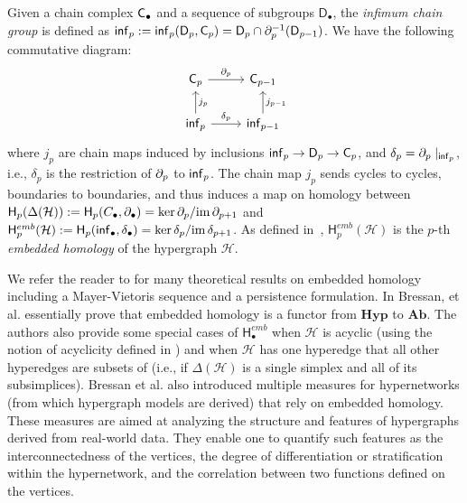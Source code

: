 \documentclass{amsart}
\newcommand{\Ab}{\mathrm{\textbf{Ab}}}
\newcommand{\Hyp}{\mathrm{\textbf{Hyp}}}
\newcommand{\Cgroup}        {\mm{\sf C}}
\newcommand{\Dgroup}	    {\mathsf{D}}
\newcommand{\Hgroup}	     {\mathsf{H}}
\renewcommand{\hom}[2]{\Hgroup_{#2}^{#1}}
\renewcommand{\H}{\mathcal{H}}
\newcommand{\myker}{\mm{\mathrm{ker\,}}}
\newcommand{\myim}{\mm{\mathrm{im\,}}}
\newcommand{\bdr}{\mm{\mathrm{\partial}}}
\newcommand {\mm}[1]        {\ifmmode{#1}\else{\mbox{\(#1\)}}\fi}
\newcommand{\infgroup}{\mm{\mathsf{inf}}}
\begin{document}
Given a chain complex $\Cgroup_\bullet$ and a sequence of subgroups $\Dgroup_\bullet$, the \emph{infimum chain group} is defined as $\infgroup_p := \infgroup_p(\Dgroup_p, \Cgroup_p) = \Dgroup_p \cap \bdr^{-1}_{p}(\Dgroup_{p-1})$. 
We have the following commutative diagram:
\[ \begin{tikzcd}
   \Cgroup_p \arrow{r}{\bdr_p} & \Cgroup_{p-1} \\%
   \infgroup_p \arrow{r}{\delta_p} \arrow[swap]{u}{j_p} & \infgroup_{p-1} \arrow[swap]{u}{j_{p-1}} 
   \end{tikzcd}
\]
where $j_p$ are chain maps induced by inclusions $\infgroup_p \to \Dgroup_p \to \Cgroup_p$, and
$\delta_p = \bdr_p \mid_{\infgroup_p}$, i.e., $\delta_p$ is the restriction of $\bdr_p$ to $\infgroup_p$.
The chain map $j_p$ sends cycles to cycles, boundaries to boundaries, and thus induces a map on homology between $\Hgroup_p(\Delta(\H)):=\Hgroup_p(C_\bullet, \bdr_\bullet) = \myker \bdr_p / \myim \bdr_{p+1} $ and $\hom{emb}{p}(\H) := \Hgroup_p(\infgroup_\bullet, \delta_\bullet) = \myker \delta_p / \myim \delta_{p+1}$.  
As defined in~\cite[page 485]{bressan_embedded_2019}, $\hom{emb}{p}(\H)$ is the $p$-th \emph{embedded homology} of the hypergraph $\H$.

We refer the reader to \cite{bressan_embedded_2019} for many theoretical results on embedded homology including a Mayer-Vietoris sequence and a persistence formulation. In \cite[Proposition 3.7]{bressan_embedded_2019} Bressan, et al. essentially prove that embedded homology is a functor from $\Hyp$ to $\Ab$. The authors also provide some special cases of $\hom{emb}{\bullet}$ when $\H$ is acyclic (using the notion of acyclicity defined in \cite{berge1984hypergraphs}) and when $\H$ has one hyperedge that all other hyperedges are subsets of (i.e., if $\Delta(\H)$ is a single simplex and all of its subsimplices). 
Bressan et al. also introduced multiple measures for hypernetworks (from which hypergraph models are derived) that rely on embedded homology. These measures are aimed at analyzing the structure and features of hypergraphs derived from real-world data. They enable one to quantify such features as the interconnectedness of the vertices, the degree of differentiation or stratification within the hypernetwork, and the correlation between two functions defined on the vertices.
\end{document}
